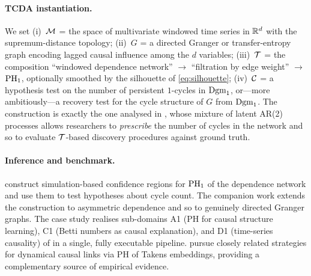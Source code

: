 \paragraph{TCDA instantiation.}
We set (i)~$\mathcal{M}$ = the space of multivariate windowed time series in
$\mathbb{R}^d$ with the supremum-distance topology; (ii)~$G$ = a directed
Granger or transfer-entropy graph encoding lagged causal influence
among the $d$ variables; (iii)~$\mathcal{T}$ = the composition ``windowed
dependence network'' $\to$ ``filtration by edge weight'' $\to$
$\mathrm{PH}_{1}$, optionally smoothed by the silhouette of
\cref{eq:silhouette}; (iv)~$\mathcal{C}$ = a hypothesis test on the number of
persistent $1$-cycles in $\mathrm{Dgm}_{1}$, or---more ambitiously---a recovery
test for the cycle structure of $G$ from $\mathrm{Dgm}_{1}$. The construction
is exactly the one analysed in \citet{elyaagoubi2023statistical}, whose
mixture of latent AR(2) processes allows researchers to \emph{prescribe}
the number of cycles in the network and so to evaluate $\mathcal{T}$-based
discovery procedures against ground truth.

\paragraph{Inference and benchmark.}
\citet{elyaagoubi2023statistical} construct simulation-based confidence
regions for $\mathrm{PH}_{1}$ of the dependence network and use them to test
hypotheses about cycle count. The companion work
\citet{elyaagoubi2023topological} extends the construction to
asymmetric dependence and so to genuinely directed Granger graphs. The
case study realises sub-domains A1 (PH for causal structure learning),
C1 (Betti numbers as causal explanation), and D1 (time-series
causality) of  in a single, fully executable
pipeline. \citet{bando2022causal,harnack2017causal,gholizadeh2018short,
krasnovsky2025causal} pursue closely related strategies for dynamical
causal links via PH of Takens embeddings, providing a complementary
source of empirical evidence.

